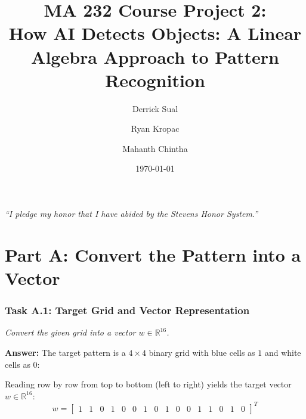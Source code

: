 \documentclass[11pt]{article}
\title{\textbf{MA 232 Course Project 2:}\\ How AI Detects Objects: A Linear Algebra Approach to Pattern Recognition}
\author{Derrick Sual \and Ryan Kropac \and Mahanth Chintha}
\date{\today}
\begin{document}
\maketitle

\begin{center}
\textit{“I pledge my honor that I have abided by the Stevens Honor System.”}
\end{center}

\vspace{1em}

\section*{Part A: Convert the Pattern into a Vector}

\subsubsection*{Task A.1: Target Grid and Vector Representation}
\textit{Convert the given grid into a vector $w \in \mathbb{R}^{16}$.}

\vspace{0.4em}
\textbf{Answer:}
The target pattern is a $4 \times 4$ binary grid with blue cells as $1$ and white cells as $0$:

\begin{center}
\end{center}

Reading row by row from top to bottom (left to right) yields the target vector $w \in \mathbb{R}^{16}$:
\[
w = \begin{bmatrix}
1 & 1 & 0 & 1 & 0 & 0 & 1 & 0 & 1 & 0 & 0 & 1 & 1 & 0 & 1 & 0
\end{bmatrix}^T
\]
\end{document}

